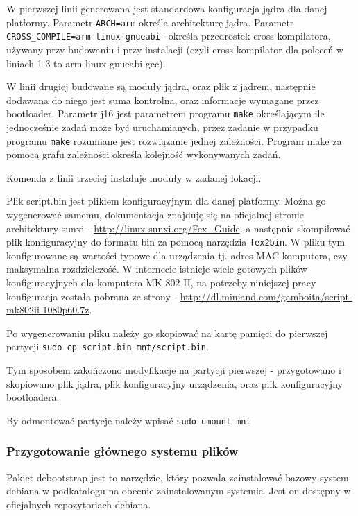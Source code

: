 W pierwszej linii generowana jest standardowa konfiguracja jądra dla danej platformy. Parametr \lstinline{ARCH=arm} określa architekturę jądra. Parametr \lstinline{CROSS_COMPILE=arm-linux-gnueabi-} określa przedrostek cross kompilatora, używany przy budowaniu i przy instalacji (czyli cross kompilator dla poleceń w liniach 1-3 to arm-linux-gnueabi-gcc).

\par

W linii drugiej budowane są moduły jądra, oraz plik z jądrem, następnie dodawana do niego jest suma kontrolna, oraz informacje wymagane przez bootloader. Parametr j16 jest parametrem programu \lstinline{make} określającym ile jednocześnie zadań może być uruchamianych, przez zadanie w przypadku programu \lstinline{make} rozumiane jest rozwiązanie jednej zależności. Program make za pomocą grafu zależności określa kolejność wykonywanych zadań.

\par
Komenda z linii trzeciej instaluje moduły w zadanej lokacji.
\par
Plik script.bin jest plikiem konfiguracyjnym dla danej platformy. Można go wygenerować samemu, dokumentacja znajduję się na oficjalnej stronie architektury sunxi - \url{http://linux-sunxi.org/Fex_Guide}. a następnie skompilować plik konfiguracyjny do formatu bin za pomocą narzędzia \lstinline{fex2bin}. W pliku tym konfigurowane są wartości typowe dla urządzenia tj. adres MAC komputera, czy maksymalna rozdzielczość.  W internecie istnieje wiele gotowych plików konfiguracyjnych dla komputera MK 802 II, na potrzeby niniejszej pracy konfiguracja została pobrana ze strony - \url{http://dl.miniand.com/gamboita/script-mk802ii-1080p60.7z}. 

Po wygenerowaniu pliku należy go skopiować na kartę pamięci do pierwszej partycji \lstinline{sudo cp script.bin mnt/script.bin}. 

Tym sposobem zakończono modyfikacje na partycji pierwszej - przygotowano i skopiowano plik jądra, plik konfiguracyjny urządzenia, oraz plik konfiguracyjny bootloadera. 

By odmontować partycje należy wpisać \lstinline{sudo umount mnt}

\subsubsection{Przygotowanie głównego systemu plików}

Pakiet debootstrap jest to narzędzie, który pozwala zainstalować bazowy system debiana w podkatalogu na obecnie zainstalowanym systemie. Jest on dostępny w oficjalnych repozytoriach debiana.

